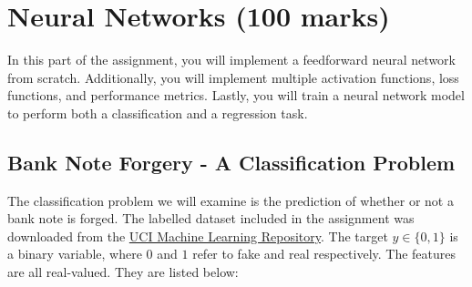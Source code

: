 \documentclass[12pt]{article}
\begin{document}

\newpage

\section{Neural Networks (100 marks)}

In this part of the assignment, you will implement a feedforward neural network from scratch. Additionally, you will implement multiple activation functions, loss functions, and performance metrics. Lastly, you will train a neural network model to perform both a classification and a regression task. 


\subsection{Bank Note Forgery - A Classification Problem}

The classification problem we will examine is the prediction of whether or not a bank note is forged. The labelled dataset included in the assignment was downloaded from the \href{https://archive.ics.uci.edu/ml/datasets/banknote+authentication}{UCI Machine Learning Repository}. The target $y \in \{0, 1\}$ is a binary variable, where $0$ and $1$ refer to fake and real respectively. The features are all real-valued. They are listed below:
\end{document}
